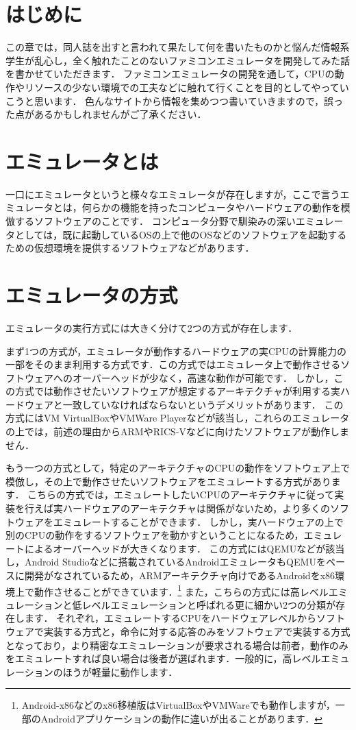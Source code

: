 \section{はじめに}
この章では，同人誌を出すと言われて果たして何を書いたものかと悩んだ情報系学生が乱心し，全く触れたことのないファミコンエミュレータを開発してみた話を書かせていただきます．
ファミコンエミュレータの開発を通して，CPUの動作やリソースの少ない環境での工夫などに触れて行くことを目的としてやっていこうと思います．
色んなサイトから情報を集めつつ書いていきますので，誤った点があるかもしれませんがご了承ください．

\section{エミュレータとは}
一口にエミュレータというと様々なエミュレータが存在しますが，ここで言うエミュレータとは，何らかの機能を持ったコンピュータやハードウェアの動作を模倣するソフトウェアのことです．
コンピュータ分野で馴染みの深いエミュレータとしては，既に起動しているOSの上で他のOSなどのソフトウェアを起動するための仮想環境を提供するソフトウェアなどがあります．

\section{エミュレータの方式}
エミュレータの実行方式には大きく分けて2つの方式が存在します．

まず1つの方式が，エミュレータが動作するハードウェアの実CPUの計算能力の一部をそのまま利用する方式です．この方式ではエミュレータ上で動作させるソフトウェアへのオーバーヘッドが少なく，高速な動作が可能です．
しかし，この方式では動作させたいソフトウェアが想定するアーキテクチャが利用する実ハードウェアと一致していなければならないというデメリットがあります．
この方式にはVM VirtualBoxやVMWare Playerなどが該当し，これらのエミュレータの上では，前述の理由からARMやRICS-Vなどに向けたソフトウェアが動作しません．

もう一つの方式として，特定のアーキテクチャのCPUの動作をソフトウェア上で模倣し，その上で動作させたいソフトウェアをエミュレートする方式があります．
こちらの方式では，エミュレートしたいCPUのアーキテクチャに従って実装を行えば実ハードウェアのアーキテクチャは関係がないため，より多くのソフトウェアをエミュレートすることができます．
しかし，実ハードウェアの上で別のCPUの動作をするソフトウェアを動かすということになるため，エミュレートによるオーバーヘッドが大きくなります．
この方式にはQEMUなどが該当し，Android Studioなどに搭載されているAndroidエミュレータもQEMUをベースに開発がなされているため，ARMアーキテクチャ向けであるAndroidをx86環境上で動作させることができています．\footnote{Android-x86などのx86移植版はVirtualBoxやVMWareでも動作しますが，一部のAndroidアプリケーションの動作に違いが出ることがあります．}
また，こちらの方式には高レベルエミュレーションと低レベルエミュレーションと呼ばれる更に細かい2つの分類が存在します．
それぞれ，エミュレートするCPUをハードウェアレベルからソフトウェアで実装する方式と，命令に対する応答のみをソフトウェアで実装する方式となっており，より精密なエミュレーションが要求される場合は前者，動作のみをエミュレートすれば良い場合は後者が選ばれます．一般的に，高レベルエミュレーションのほうが軽量に動作します．

